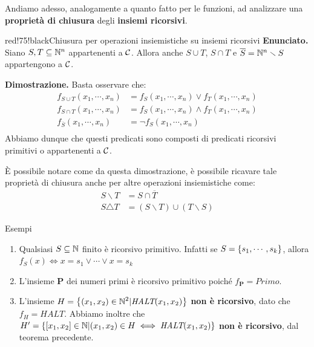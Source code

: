 Andiamo adesso, analogamente a quanto fatto per le funzioni, ad analizzare una \textbf{proprietà di chiusura} degli \textbf{insiemi ricorsivi}.
\begin{halfframedbox}{red!75!black}{Chiusura per operazioni insiemistiche su insiemi ricorsivi}\label{Chiusura per operazioni insiemistiche su insiemi ricorsivi}
  \textbf{Enunciato. } Siano \(S,T \subseteq \mathbb{N}^n\) appartenenti a \(\mathcal{C}\). Allora anche \(S\cup T\), \(S\cap T\) e \(\overline{S}=\mathbb{N}^n\smallsetminus S\) appartengono a \(\mathcal{C}\).
  \begin{center}
    \textcolor{red!75!black}{\hdashrule[0.5ex]{18cm}{1pt}{3mm 3pt 1mm 2pt}}
  \end{center}
  \textbf{Dimostrazione. } Basta osservare che:
  \begin{equation}
    \begin{split}
      f_{S\cup T}(x_1, \cdots, x_n) &= f_S(x_1, \cdots, x_n) \lor f_T(x_1, \cdots, x_n)\\
      f_{S\cap T}(x_1, \cdots, x_n) &= f_S(x_1, \cdots, x_n) \land f_T(x_1, \cdots, x_n)\\
      f_{\overline{S}}(x_1, \cdots, x_n) &= \lnot f_S(x_1, \cdots, x_n)\\
    \end{split}
  \end{equation}
  Abbiamo dunque che questi predicati sono composti di predicati ricorsivi primitivi o appartenenti a \(\mathcal{C}\).
\end{halfframedbox}

È possibile notare come da questa dimostrazione, è possibile ricavare tale proprietà di chiusura anche per altre operazioni insiemistiche come:
\begin{equation}
  \begin{split}
    S \smallsetminus T &= S \cap \overline{T}\\
    S \triangle  T &= (S \smallsetminus T) \cup (T \smallsetminus S)
  \end{split}
\end{equation}

\begin{generalbox}[colframe=azure-gradient-3!90!black]{Esempi}
  \begin{enumerate}
    \item Qualsiasi \(S\subseteq \mathbb{N}\) finito è ricorsivo primitivo.
    Infatti se \(S=\displaystyle{\left\{{s_1, \cdots, s_k}\right\}}\), allora \(f_S(x) \iff x=s_1 \lor \cdots \lor x=s_k\)
    \item L'insieme \(\mathbf{P}\) dei numeri primi è ricorsivo primitivo poiché \(f_{\mathbf{P}}=Primo\).
    \item L'insieme \(H=\displaystyle{\left\{{(x_1, x_2) \in \mathbb{N}^2 \vert \textit{HALT}(x_1, x_2)}\right\}}\) \textbf{non è ricorsivo}, dato che \(f_H=\textit{HALT}\). Abbiamo inoltre che \(H'=\displaystyle{\left\{{[x_1,x_2] \in \mathbb{N}\vert (x_1, x_2) \in H \iff \textit{HALT}(x_1, x_2)}\right\}}\) \textbf{non è ricorsivo}, dal teorema precedente.
  \end{enumerate}
\end{generalbox}


